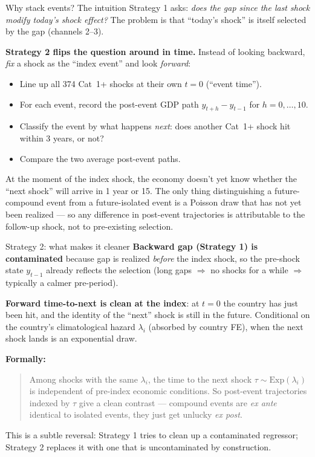\documentclass[aspectratio=169]{beamer}
\begin{document}
\begin{frame}{Why stack events? The intuition}
Strategy 1 asks: \emph{does the gap since the last shock modify today's shock effect?} The problem is that ``today's shock'' is itself selected by the gap (channels 2--3).

\medskip
\textbf{Strategy 2 flips the question around in time.} Instead of looking backward, \emph{fix} a shock as the ``index event'' and look \emph{forward}:
\begin{itemize}
  \item Line up all 374 Cat~1+ shocks at their own $t = 0$ (``event time'').
  \item For each event, record the post-event GDP path $y_{t+h} - y_{t-1}$ for $h = 0, \ldots, 10$.
  \item Classify the event by what happens \emph{next}: does another Cat~1+ shock hit within 3 years, or not?
  \item Compare the two average post-event paths.
\end{itemize}

\medskip
At the moment of the index shock, the economy doesn't yet know whether the ``next shock'' will arrive in 1 year or 15. The only thing distinguishing a future-compound event from a future-isolated event is a Poisson draw that has not yet been realized --- so any difference in post-event trajectories is attributable to the follow-up shock, not to pre-existing selection.
\end{frame}

\begin{frame}{Strategy 2: what makes it cleaner}
\textbf{Backward gap (Strategy 1) is contaminated} because gap is realized \emph{before} the index shock, so the pre-shock state $y_{t-1}$ already reflects the selection (long gaps $\Rightarrow$ no shocks for a while $\Rightarrow$ typically a calmer pre-period).

\medskip
\textbf{Forward time-to-next is clean at the index}: at $t=0$ the country has just been hit, and the identity of the ``next'' shock is still in the future. Conditional on the country's climatological hazard $\lambda_i$ (absorbed by country FE), when the next shock lands is an exponential draw.

\medskip
\textbf{Formally:}
\begin{quote}
Among shocks with the same $\lambda_i$, the time to the next shock $\tau \sim \mathrm{Exp}(\lambda_i)$ is independent of pre-index economic conditions. So post-event trajectories indexed by $\tau$ give a clean contrast --- compound events are \emph{ex ante} identical to isolated events, they just get unlucky \emph{ex post}.
\end{quote}

\medskip
This is a subtle reversal: Strategy 1 tries to clean up a contaminated regressor; Strategy 2 replaces it with one that is uncontaminated by construction.
\end{frame}
\end{document}
